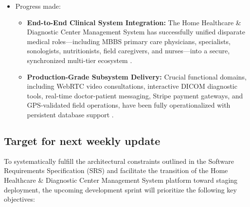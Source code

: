 \documentclass[onecolumn,journal]{IEEEtran}
\begin{document}
\begin{itemize}
\begin{itemize}
			\item \textbf{Spatial Validation for Unattended Home Care Visits:} Securing the caregiver check-in mechanism against location spoofing required robust backend verification \cite{zandbergen2009accuracy}. Incoming location payloads are evaluated against registered patient spatial targets using spherical distance formulas on the server side before authorizing shift initialization and time tracking.
		\end{itemize}
		
		\item Progress made:
		\begin{itemize}
			\item \textbf{End-to-End Clinical System Integration:} The Home Healthcare \& Diagnostic Center Management System has successfully unified disparate medical roles—including MBBS primary care physicians, specialists, sonologists, nutritionists, field caregivers, and nurses—into a secure, synchronized multi-tier ecosystem \cite{srs2026}.
			
			\item \textbf{Production-Grade Subsystem Delivery:} Crucial functional domains, including WebRTC video consultations, interactive DICOM diagnostic tools, real-time doctor-patient messaging, Stripe payment gateways, and GPS-validated field operations, have been fully operationalized with persistent database support \cite{agorawebrtc, stripe2024api}.
		\end{itemize}
	\end{itemize}
	
	\subsection{Target for next weekly update}
	
	To systematically fulfill the architectural constraints outlined in the Software Requirements Specification (SRS) \cite{srs2026} and facilitate the transition of the Home Healthcare \& Diagnostic Center Management System platform toward staging deployment, the upcoming development sprint will prioritize the following key objectives:
	
\end{document}
